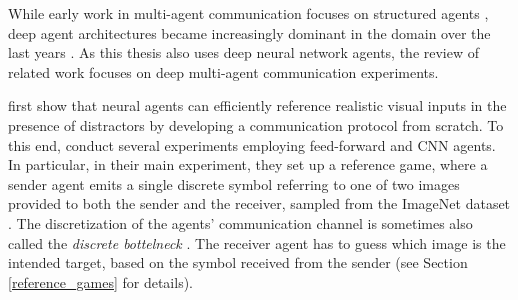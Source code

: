 While early work in multi-agent communication focuses on structured agents \parencite[e. g., see][for reviews]{christiansen2003language, cangelosi2002symbol}, deep agent architectures became increasingly dominant in the domain over the last years \parencite{lazaridou2020emergent}. As this thesis also uses deep neural network agents, the review of related work focuses on deep multi-agent communication experiments. 


\cite{lazaridou2016multi} first show that neural agents can efficiently reference realistic visual inputs in the presence of distractors by developing a communication protocol from scratch. To this end, \textcite{lazaridou2016multi} conduct several experiments employing feed-forward and CNN agents. In particular, in their main experiment, they set up a reference game, where a sender agent emits a single discrete symbol referring to one of two images provided to both the sender and the receiver, sampled from the ImageNet dataset \parencite{deng2009imagenet}. The discretization of the agents' communication channel is sometimes also called the \textit{discrete bottelneck} \parencite{lazaridou2020multi}. 
The receiver agent has to guess  which image is the intended target, based on the symbol received from the sender (see Section \ref{reference_games} for details). %
